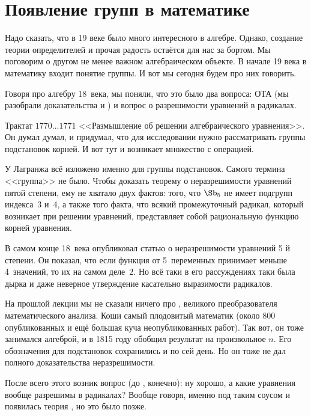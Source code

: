 \documentclass[a4paper,oneside,fleqn,10pt]{article}
\newcommand{\pe}[2]{${#1}\ldots{#2}$}
\begin{document}

\section{Появление групп в математике}

Надо сказать, что в 19 веке было много интересного в алгебре.  Однако,
создание теории определителей и прочая радость остаётся для нас за
бортом.  Мы поговорим о другом не менее важном алгебраическом объекте.
В начале 19 века в математику входит понятие группы. И вот мы сегодня
будем про них говорить.

Говоря про алгебру 18~века, мы поняли, что это было два вопроса: ОТА
(мы разобрали доказательства  и
) и вопрос о разрешимости уравнений в
радикалах.

Трактат  \pe{1770}{1771} <<Размышление об
решении алгебраического уравнения>>.  Он думал думал, и придумал, что
для исследовании нужно рассматривать группы подстановок корней. И вот
тут и возникает множество с операцией.

У Лагранжа всё изложено именно для группы подстановок. Самого термина
<<группа>> не было.  Чтобы доказать теорему о неразрешимости уравнений
пятой степени, ему не хватало двух фактов: того, что $\Sb_5$ не имеет
подгрупп индекса~3 и~4, а также того факта, что всякий промежуточный
радикал, который возникает при решении уравнений, представляет собой
рациональную функцию корней уравнения.

В самом конце 18~века 
опубликовал статью о неразрешимости уравнений 5 й степени. Он показал,
что если функция от 5~переменных принимает меньше 4~значений, то их на
самом деле~2. Но всё таки в его рассуждениях таки была дырка и даже
неверное утверждение касательно выразимости радикалов.

На прошлой лекции мы не сказали ничего про , великого
преобразователя математического анализа.  Коши самый плодовитый
математик (около 800 опубликованных и ещё большая куча
неопубликованных работ).  Так вот, он тоже занимался алгеброй, и в
1815 году обобщил результат  на произвольное $n$.  Его
обозначения для подстановок сохранились и по сей день. Но он тоже не
дал полного доказательства неразрешимости.

После всего этого возник вопрос (до , конечно): ну
хорошо, а какие уравнения вообще разрешимы в радикалах? Вообще говоря,
именно под таким соусом и появилась теория , но это было
позже.
\end{document}
